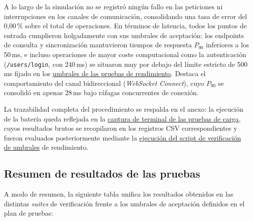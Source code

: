 A lo largo de la simulación no se registró ningún fallo en las peticiones ni interrupciones en los canales de comunicación, consolidando una tasa de error del 0{,}00\,\% sobre el total de operaciones. En términos de latencia, todos los puntos de entrada cumplieron holgadamente con sus umbrales de aceptación: los endpoints de consulta y sincronización mantuvieron tiempos de respuesta $P_{90}$ inferiores a los 50\,ms, e incluso operaciones de mayor coste computacional como la autenticación (\texttt{/users/login}, con 240\,ms) se situaron muy por debajo del límite estricto de 500\,ms fijado en los \hyperref[tab:metricas_rendimiento]{umbrales de las pruebas de rendimiento}. Destaca el comportamiento del canal bidireccional (\textit{WebSocket Connect}), cuyo $P_{90}$ se consolidó en apenas 28\,ms bajo ráfagas concurrentes de conexión.

La trazabilidad completa del procedimiento se respalda en el anexo: la ejecución de la batería queda reflejada en la \hyperref[ev:terminal_test_locust]{captura de terminal de las pruebas de carga}, cuyos resultados brutos se recopilaron en los registros CSV correspondientes y fueron evaluados posteriormente mediante la \hyperref[ev:terminal_umbrales_locust]{ejecución del script de verificación de umbrales} de rendimiento.

\vspace{0.1cm}

\subsection{Resumen de resultados de las pruebas}\label{sub:resumen_pruebas}

A modo de resumen, la siguiente tabla unifica los resultados obtenidos en las distintas \textit{suites} de verificación frente a los umbrales de aceptación definidos en el plan de pruebas:

\vspace{0.1cm}

